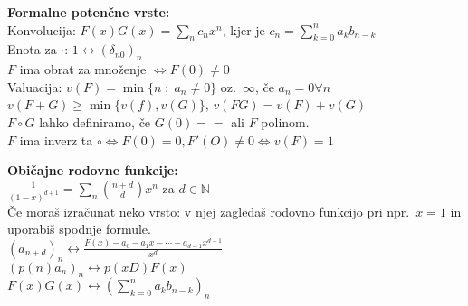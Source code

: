 \documentclass[a4paper, oneside, 12pt]{article}
\title{\mytitle}
\author{Jure Slak}
\date{\today}
\theoremstyle{definition}
\def\N{\mathbb{N}}
\newcommand{\rf}{\longleftrightarrow}
\begin{document}
\pagestyle{empty}

\textbf{Formalne potenčne vrste:}\\
Konvolucija: $F(x) G(x) = \sum_n c_n x^n$, kjer je $c_n = \sum_{k=0}^n a_k b_{n-k}$\\
Enota za $\cdot$: $1 \rf (\delta_{n0})_n$\\
$F$ ima obrat za množenje $\iff F(0) \neq 0$\\
Valuacija: $v(F) = \min\{n \; ; \; a_n \neq 0\}$ oz.\ $\infty$, če $a_n = 0 \forall n$\\
$v(F + G) \geq \min\{v(f), v(G)\}$, $v(FG) = v(F) + v(G)$\\
$F \circ G$ lahko definiramo, če $G(0) = =$ ali $F$ polinom.\\
$F$ ima inverz ta $\circ \iff F(0)=0, F'(O) \neq 0 \iff v(F) = 1$

\textbf{Običajne rodovne funkcije: } \\
$\frac{1}{(1 - x)^{d+1}} = \sum_n \binom{n+d}{d} x^n$ za $d \in \N$\\
Če moraš izračunat neko vrsto: v njej zagledaš rodovno funkcijo pri npr.\ $x=1$ in uporabiš spodnje formule.\\
$(a_{n+d})_n \rf \frac{F(x) - a_0 - a_1 x - \cdots - a_{d-1} x^{d-1}}{x^d}$\\
$(p(n) a_n)_n \rf p(x D) F(x)$\\
$F(x)G(x) \rf (\sum_{k=0}^n a_k b_{n-k})_n$
\end{document}

